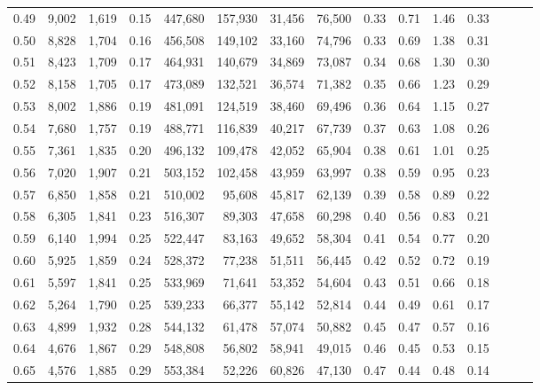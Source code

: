 \begin{tabular}{rrrrrrrrrrrrrrr}
0.49 &   9,002 &  1,619 &  0.15 &  447,680 &  157,930 &   31,456 &   76,500 &  0.33 &  0.71 &  1.46 &      0.33 \\
0.50 &   8,828 &  1,704 &  0.16 &  456,508 &  149,102 &   33,160 &   74,796 &  0.33 &  0.69 &  1.38 &      0.31 \\
0.51 &   8,423 &  1,709 &  0.17 &  464,931 &  140,679 &   34,869 &   73,087 &  0.34 &  0.68 &  1.30 &      0.30 \\
0.52 &   8,158 &  1,705 &  0.17 &  473,089 &  132,521 &   36,574 &   71,382 &  0.35 &  0.66 &  1.23 &      0.29 \\
0.53 &   8,002 &  1,886 &  0.19 &  481,091 &  124,519 &   38,460 &   69,496 &  0.36 &  0.64 &  1.15 &      0.27 \\
0.54 &   7,680 &  1,757 &  0.19 &  488,771 &  116,839 &   40,217 &   67,739 &  0.37 &  0.63 &  1.08 &      0.26 \\
0.55 &   7,361 &  1,835 &  0.20 &  496,132 &  109,478 &   42,052 &   65,904 &  0.38 &  0.61 &  1.01 &      0.25 \\
0.56 &   7,020 &  1,907 &  0.21 &  503,152 &  102,458 &   43,959 &   63,997 &  0.38 &  0.59 &  0.95 &      0.23 \\
0.57 &   6,850 &  1,858 &  0.21 &  510,002 &   95,608 &   45,817 &   62,139 &  0.39 &  0.58 &  0.89 &      0.22 \\
0.58 &   6,305 &  1,841 &  0.23 &  516,307 &   89,303 &   47,658 &   60,298 &  0.40 &  0.56 &  0.83 &      0.21 \\
0.59 &   6,140 &  1,994 &  0.25 &  522,447 &   83,163 &   49,652 &   58,304 &  0.41 &  0.54 &  0.77 &      0.20 \\
0.60 &   5,925 &  1,859 &  0.24 &  528,372 &   77,238 &   51,511 &   56,445 &  0.42 &  0.52 &  0.72 &      0.19 \\
0.61 &   5,597 &  1,841 &  0.25 &  533,969 &   71,641 &   53,352 &   54,604 &  0.43 &  0.51 &  0.66 &      0.18 \\
0.62 &   5,264 &  1,790 &  0.25 &  539,233 &   66,377 &   55,142 &   52,814 &  0.44 &  0.49 &  0.61 &      0.17 \\
0.63 &   4,899 &  1,932 &  0.28 &  544,132 &   61,478 &   57,074 &   50,882 &  0.45 &  0.47 &  0.57 &      0.16 \\
0.64 &   4,676 &  1,867 &  0.29 &  548,808 &   56,802 &   58,941 &   49,015 &  0.46 &  0.45 &  0.53 &      0.15 \\
0.65 &   4,576 &  1,885 &  0.29 &  553,384 &   52,226 &   60,826 &   47,130 &  0.47 &  0.44 &  0.48 &      0.14 \\

\end{tabular}
